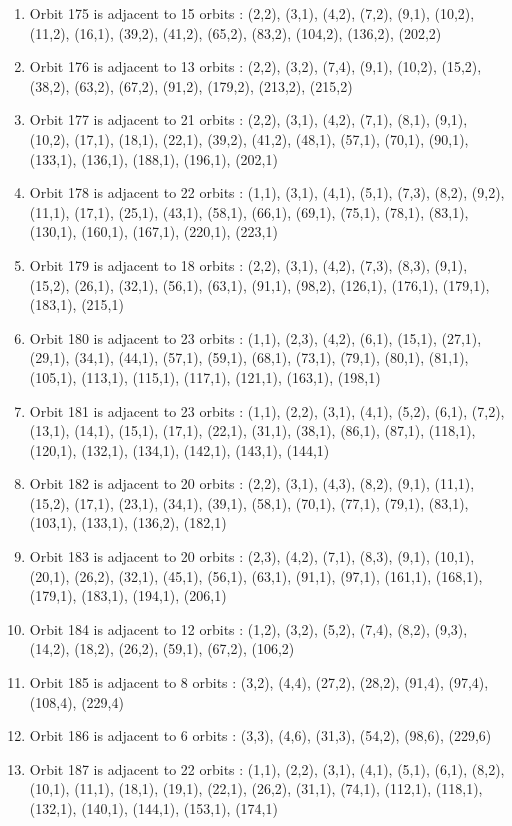 \documentclass[12pt]{article}
\begin{document}
\begin{enumerate}
\item Orbit 175 is adjacent to 15 orbits : (2,2), (3,1), (4,2), (7,2), (9,1), (10,2), (11,2), (16,1), (39,2), (41,2), (65,2), (83,2), (104,2), (136,2), (202,2)
\item Orbit 176 is adjacent to 13 orbits : (2,2), (3,2), (7,4), (9,1), (10,2), (15,2), (38,2), (63,2), (67,2), (91,2), (179,2), (213,2), (215,2)
\item Orbit 177 is adjacent to 21 orbits : (2,2), (3,1), (4,2), (7,1), (8,1), (9,1), (10,2), (17,1), (18,1), (22,1), (39,2), (41,2), (48,1), (57,1), (70,1), (90,1), (133,1), (136,1), (188,1), (196,1), (202,1)
\item Orbit 178 is adjacent to 22 orbits : (1,1), (3,1), (4,1), (5,1), (7,3), (8,2), (9,2), (11,1), (17,1), (25,1), (43,1), (58,1), (66,1), (69,1), (75,1), (78,1), (83,1), (130,1), (160,1), (167,1), (220,1), (223,1)
\item Orbit 179 is adjacent to 18 orbits : (2,2), (3,1), (4,2), (7,3), (8,3), (9,1), (15,2), (26,1), (32,1), (56,1), (63,1), (91,1), (98,2), (126,1), (176,1), (179,1), (183,1), (215,1)
\item Orbit 180 is adjacent to 23 orbits : (1,1), (2,3), (4,2), (6,1), (15,1), (27,1), (29,1), (34,1), (44,1), (57,1), (59,1), (68,1), (73,1), (79,1), (80,1), (81,1), (105,1), (113,1), (115,1), (117,1), (121,1), (163,1), (198,1)
\item Orbit 181 is adjacent to 23 orbits : (1,1), (2,2), (3,1), (4,1), (5,2), (6,1), (7,2), (13,1), (14,1), (15,1), (17,1), (22,1), (31,1), (38,1), (86,1), (87,1), (118,1), (120,1), (132,1), (134,1), (142,1), (143,1), (144,1)
\item Orbit 182 is adjacent to 20 orbits : (2,2), (3,1), (4,3), (8,2), (9,1), (11,1), (15,2), (17,1), (23,1), (34,1), (39,1), (58,1), (70,1), (77,1), (79,1), (83,1), (103,1), (133,1), (136,2), (182,1)
\item Orbit 183 is adjacent to 20 orbits : (2,3), (4,2), (7,1), (8,3), (9,1), (10,1), (20,1), (26,2), (32,1), (45,1), (56,1), (63,1), (91,1), (97,1), (161,1), (168,1), (179,1), (183,1), (194,1), (206,1)
\item Orbit 184 is adjacent to 12 orbits : (1,2), (3,2), (5,2), (7,4), (8,2), (9,3), (14,2), (18,2), (26,2), (59,1), (67,2), (106,2)
\item Orbit 185 is adjacent to 8 orbits : (3,2), (4,4), (27,2), (28,2), (91,4), (97,4), (108,4), (229,4)
\item Orbit 186 is adjacent to 6 orbits : (3,3), (4,6), (31,3), (54,2), (98,6), (229,6)
\item Orbit 187 is adjacent to 22 orbits : (1,1), (2,2), (3,1), (4,1), (5,1), (6,1), (8,2), (10,1), (11,1), (18,1), (19,1), (22,1), (26,2), (31,1), (74,1), (112,1), (118,1), (132,1), (140,1), (144,1), (153,1), (174,1)

\end{enumerate}
\end{document}
